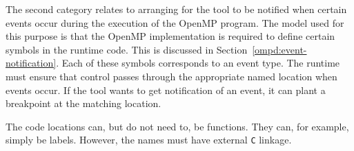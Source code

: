 The second category relates to arranging for the tool to be notified
when certain events occur during the execution of the OpenMP program.
The model used for this purpose is that the OpenMP implementation
is required to define certain symbols in the runtime code.
This is discussed in Section~\ref{ompd:event-notification}.
Each of these symbols corresponds to an event type.
The runtime must ensure that control passes through the appropriate
named location when events occur.
If the tool wants to get notification of an event, it can plant
a breakpoint at the matching location.

The code locations can, but do not need to, be functions.
They can, for example, simply be labels.
However, the names must have external \texttt{C} linkage.

